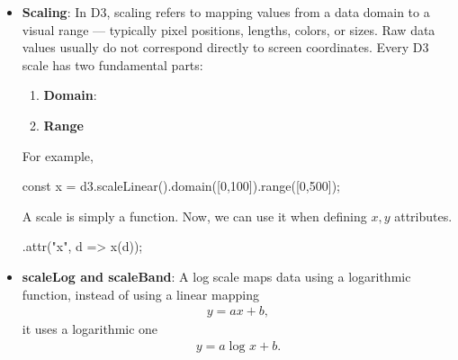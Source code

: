 \documentclass{report}
\begin{document}
\begin{itemize}
\begin{jscode}
{                  // Second selection (within first selection)
                  var selB = selA.selectAll('circle')
                    .data(d => d)
                    .join("circle")
                    .attr("cx", (d, i) => i*80)
                    .attr("r", (d,i) => d)
                };
            \end{jscode}
        \item \textbf{Scaling}: In D3, scaling refers to mapping values from a data domain to a visual range — typically pixel positions, lengths, colors, or sizes. Raw data values usually do not correspond directly to screen coordinates.
            \bigbreak \noindent 
            Every D3 scale has two fundamental parts:
            \begin{enumerate}
                \item \textbf{Domain}:
                    \bigbreak \noindent 
                    \begin{jscode}
                    \end{jscode}
                \item \textbf{Range}
                    \bigbreak \noindent 
                    \begin{jscode}
                    \end{jscode}
            \end{enumerate}
            For example,
            \bigbreak \noindent 
            \begin{jscode}
                const x = d3.scaleLinear().domain([0,100]).range([0,500]);
            \end{jscode}
            \bigbreak \noindent 
            A scale is simply a function. Now, we can use it when defining $x,y$ attributes.
            \bigbreak \noindent 
            \begin{jscode}
            .attr("x", d => x(d));
            \end{jscode}
        \item \textbf{scaleLog and scaleBand}: A log scale maps data using a logarithmic function, instead of using a linear mapping
            \begin{align*}
                y = ax + b
            ,\end{align*}
            it uses a logarithmic one
            \begin{align*}
               y = a\log_{}{x} + b 
            .\end{align*}

\end{itemize}
\end{document}
